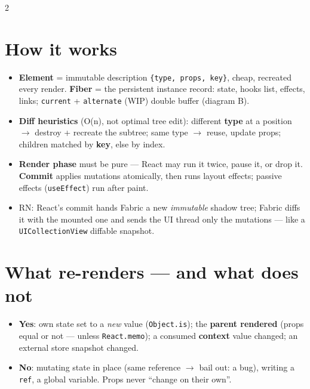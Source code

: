 \documentclass[8pt]{extarticle}
\begin{document}
\begin{multicols}{2}
\raggedright

\section{How it works}
\begin{itemize}
  \item \textbf{Element} = immutable description \texttt{\{type, props, key\}}, cheap,
        recreated every render. \textbf{Fiber} = the persistent instance record: state,
        hooks list, effects, links; \texttt{current} + \texttt{alternate} (WIP)
        double buffer (diagram B).
  \item \textbf{Diff heuristics} (O(n), not optimal tree edit): different \textbf{type} at
        a position $\to$ destroy + recreate the subtree; same type $\to$ reuse, update
        props; children matched by \textbf{key}, else by index.
  \item \textbf{Render phase} must be pure — React may run it twice, pause it, or drop
        it. \textbf{Commit} applies mutations atomically, then runs layout effects;
        passive effects (\texttt{useEffect}) run after paint.
  \item RN: React's commit hands Fabric a new \emph{immutable} shadow tree; Fabric
        diffs it with the mounted one and sends the UI thread only the mutations —
        like a \texttt{UICollectionView} diffable snapshot.
\end{itemize}

\section{What re-renders — and what does not}
\begin{itemize}
  \item \textbf{Yes}: own state set to a \emph{new} value (\texttt{Object.is}); the
        \textbf{parent rendered} (props equal or not — unless \texttt{React.memo});
        a consumed \textbf{context} value changed; an external store snapshot changed.
  \item \textbf{No}: mutating state in place (same reference $\to$ bail out: a bug),
        writing a \texttt{ref}, a global variable. Props never ``change on their own''.
\end{itemize}


\end{multicols}
\end{document}
